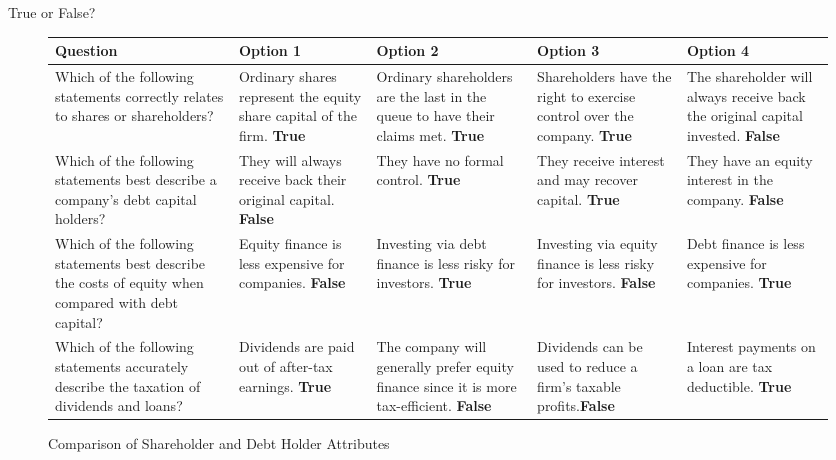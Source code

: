 \begin{examplebox}{True or False?}

\begin{figure}[H] 
        \footnotesize
        \centering
        \begin{tabular}{|p{2.8cm}|p{2.8cm}|p{2.8cm}|p{2.8cm}|p{2.8cm}|}          
        \hline
        \textbf{Question} & \textbf{Option 1} & \textbf{Option 2} & \textbf{Option 3} & \textbf{Option 4} \\
        \hline
        Which of the following statements correctly relates to shares or shareholders? & 
        Ordinary shares represent the equity share capital of the firm. \textbf{True} & 
        Ordinary shareholders are the last in the queue to have their claims met. \textbf{True} & 
        Shareholders have the right to exercise control over the company. \textbf{True}& 
        The shareholder will always receive back the original capital invested. \textbf{False} \\
        \hline
        Which of the following statements best describe a company’s debt capital holders? & 
        They will always receive back their original capital. \textbf{False} & 
        They have no formal control. \textbf{True}& 
        They receive interest and may recover capital. \textbf{True} & 
        They have an equity interest in the company. \textbf{False}\\
        \hline
        Which of the following statements best describe the costs of equity when compared with debt capital? & 
        Equity finance is less expensive for companies. \textbf{False} & 
        Investing via debt finance is less risky for investors. \textbf{True}& 
        Investing via equity finance is less risky for investors. \textbf{False}& 
        Debt finance is less expensive for companies. \textbf{True}\\
        \hline
        Which of the following statements accurately describe the taxation of dividends and loans? & 
        Dividends are paid out of after-tax earnings. \textbf{True} & 
        The company will generally prefer equity finance since it is more tax-efficient. \textbf{False}& 
        Dividends can be used to reduce a firm’s taxable profits.\textbf{False} & 
        Interest payments on a loan are tax deductible. \textbf{True} \\
        \hline
        \end{tabular}
        \caption{Comparison of Shareholder and Debt Holder Attributes}
        \label{table:share_debt}

\end{figure}

\end{examplebox}



